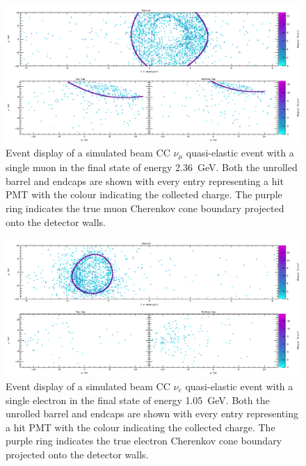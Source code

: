 \begin{figure} %
    \includegraphics[width=\textwidth]{diagrams/4-chips/cc_numu_event.pdf}
    \caption[Event display of a simulated beam CC $\nu_{\mu}$ event]
    {Event display of a simulated beam CC $\nu_{\mu}$ quasi-elastic event with a single muon in
        the final state of energy \SI{2.36}{\GeV}. Both the unrolled barrel and endcaps are shown
        with every entry representing a hit PMT with the colour indicating the collected charge.
        The purple ring indicates the true muon Cherenkov cone boundary projected onto the
        detector walls.}
    \label{fig:cc_numu_event}
\end{figure}

\begin{figure} %
    \includegraphics[width=\textwidth]{diagrams/4-chips/cc_nue_event.pdf}
    \caption[Event display of a simulated beam CC $\nu_{e}$ event]
    {Event display of a simulated beam CC $\nu_{e}$ quasi-elastic event with a single electron in
        the final state of energy \SI{1.05}{\GeV}. Both the unrolled barrel and endcaps are shown
        with every entry representing a hit PMT with the colour indicating the collected charge.
        The purple ring indicates the true electron Cherenkov cone boundary projected onto the
        detector walls.}
    \label{fig:cc_nue_event}
\end{figure}

